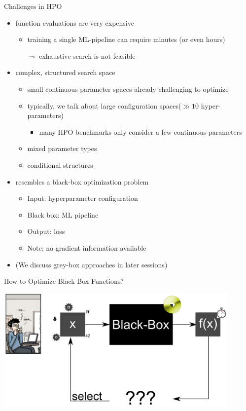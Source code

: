 \begin{frame}[c]{Challenges in HPO}

\begin{itemize}
  \item function evaluations are very expensive
  \begin{itemize}
    \item training a single ML-pipeline can require minutes (or even hours) 
    \item[$\leadsto$] exhaustive search is not feasible
  \end{itemize}
  \pause
  \medskip
  \item complex, structured search space
  \begin{itemize}
    \item small continuous parameter spaces already challenging to optimize
    \item typically, we talk about large configuration spaces\newline ($\gg 10$ hyper-parameters)
    \begin{itemize}
      \item many HPO benchmarks only consider a few continuous parameters
    \end{itemize}
    \item mixed parameter types
    \item conditional structures
  \end{itemize}
  \pause
  \medskip
  \item resembles a black-box optimization problem
  \begin{itemize}
    \item Input: hyperparameter configuration
    \item Black box: ML pipeline 
    \item Output: loss
    \item Note: no gradient information available
  \end{itemize}
  \pause
  \item (We discuss grey-box approaches in later sessions)
\end{itemize}

\end{frame}
\begin{frame}[c]{How to Optimize Black Box Functions?}

\centering
\includegraphics[width=0.9\textwidth]{images/black_box_aut_opt.png}

\end{frame}
